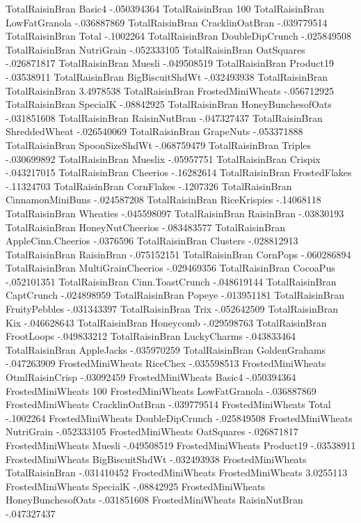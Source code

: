 TotalRaisinBran	Basic4	-.050394364
TotalRaisinBran	100%
TotalRaisinBran	LowFatGranola	-.036887869
TotalRaisinBran	CracklinOatBran	-.039779514
TotalRaisinBran	Total	-.1002264
TotalRaisinBran	DoubleDipCrunch	-.025849508
TotalRaisinBran	NutriGrain	-.052333105
TotalRaisinBran	OatSquares	-.026871817
TotalRaisinBran	Muesli	-.049508519
TotalRaisinBran	Product19	-.03538911
TotalRaisinBran	BigBiscuitShdWt	-.032493938
TotalRaisinBran	TotalRaisinBran	3.4978538
TotalRaisinBran	FrostedMiniWheats	-.056712925
TotalRaisinBran	SpecialK	-.08842925
TotalRaisinBran	HoneyBunchesofOats	-.031851608
TotalRaisinBran	RaisinNutBran	-.047327437
TotalRaisinBran	ShreddedWheat	-.026540069
TotalRaisinBran	GrapeNuts	-.053371888
TotalRaisinBran	SpoonSizeShdWt	-.068759479
TotalRaisinBran	Triples	-.030699892
TotalRaisinBran	Mueslix	-.05957751
TotalRaisinBran	Crispix	-.043217015
TotalRaisinBran	Cheerios	-.16282614
TotalRaisinBran	FrostedFlakes	-.11324703
TotalRaisinBran	CornFlakes	-.1207326
TotalRaisinBran	CinnamonMiniBuns	-.024587208
TotalRaisinBran	RiceKrispies	-.14068118
TotalRaisinBran	Wheaties	-.045598097
TotalRaisinBran	RaisinBran	-.03830193
TotalRaisinBran	HoneyNutCheerios	-.083483577
TotalRaisinBran	AppleCinn.Cheerios	-.0376596
TotalRaisinBran	Clusters	-.028812913
TotalRaisinBran	RaisinBran	-.075152151
TotalRaisinBran	CornPops	-.060286894
TotalRaisinBran	MultiGrainCheerios	-.029469356
TotalRaisinBran	CocoaPus	-.052101351
TotalRaisinBran	Cinn.ToastCrunch	-.048619144
TotalRaisinBran	CaptCrunch	-.024898959
TotalRaisinBran	Popeye	-.013951181
TotalRaisinBran	FruityPebbles	-.031343397
TotalRaisinBran	Trix	-.052642509
TotalRaisinBran	Kix	-.046628643
TotalRaisinBran	Honeycomb	-.029598763
TotalRaisinBran	FrootLoops	-.049833212
TotalRaisinBran	LuckyCharms	-.043833464
TotalRaisinBran	AppleJacks	-.035970259
TotalRaisinBran	GoldenGrahams	-.047263909
FrostedMiniWheats	RiceChex	-.035598513
FrostedMiniWheats	OtmlRaisinCrisp	-.03092459
FrostedMiniWheats	Basic4	-.050394364
FrostedMiniWheats	100%
FrostedMiniWheats	LowFatGranola	-.036887869
FrostedMiniWheats	CracklinOatBran	-.039779514
FrostedMiniWheats	Total	-.1002264
FrostedMiniWheats	DoubleDipCrunch	-.025849508
FrostedMiniWheats	NutriGrain	-.052333105
FrostedMiniWheats	OatSquares	-.026871817
FrostedMiniWheats	Muesli	-.049508519
FrostedMiniWheats	Product19	-.03538911
FrostedMiniWheats	BigBiscuitShdWt	-.032493938
FrostedMiniWheats	TotalRaisinBran	-.031410452
FrostedMiniWheats	FrostedMiniWheats	3.0255113
FrostedMiniWheats	SpecialK	-.08842925
FrostedMiniWheats	HoneyBunchesofOats	-.031851608
FrostedMiniWheats	RaisinNutBran	-.047327437
